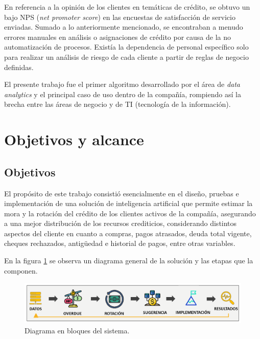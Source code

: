 En referencia a la opinión de los clientes en temáticas de crédito, se obtuvo un bajo NPS (\textit{net promoter score}) en las encuestas de satisfacción de servicio enviadas.
Sumado a lo anteriormente mencionado, se encontraban a menudo errores manuales en análisis o asignaciones de crédito  por causa de la no automatización de procesos. Existía la dependencia de personal específico solo para realizar un análisis de riesgo de cada cliente a partir de reglas de negocio definidas.

El presente trabajo fue el primer algoritmo desarrollado por el área de \textit{data analytics} y el principal caso de uso dentro de la compañía, rompiendo así la brecha entre las áreas de negocio y de TI (tecnología de la información).



\section{Objetivos y alcance}

\subsection{Objetivos}

El propósito de este trabajo consistió esencialmente en el diseño, pruebas e implementación de una solución de inteligencia artificial que permite estimar la mora
y la rotación del crédito de los clientes activos de la compañía, asegurando a una mejor distribución de los recursos crediticios, considerando distintos aspectos del cliente en cuanto a compras, pagos atrasados, deuda total vigente, cheques rechazados, antigüedad e historial de pagos, entre otras variables.

En la figura \ref{fig:Diagrama en bloques del sistema}  se observa un diagrama general de la solución y las etapas que la componen.

\vspace{1cm}
\begin{figure}[htbp]
	\centering
	\includegraphics[width=1.0\textwidth]{./Figures/Diagrama de FlujoV2.png}
	\caption{Diagrama en bloques del sistema.}
	\label{fig:Diagrama en bloques del sistema}
\end{figure}
\vspace{1cm}

